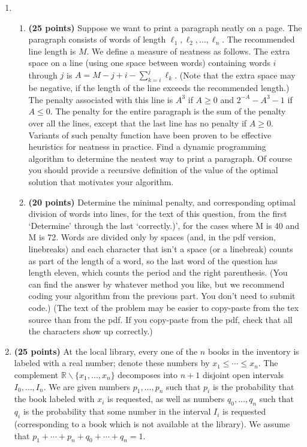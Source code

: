 \documentclass[11pt]{article}
\begin{document}
\begin{enumerate}
\item
\begin{enumerate}
\item
{\bf (25 points)}
Suppose we want to print a paragraph neatly on a page. The
paragraph consists of words of length $\ell_1,\ell_2,\ldots,\ell_n$.
The recommended line length is $M$. We
define a measure of neatness as follows. The extra space on a line
(using one space between words) containing words $i$ through
$j$  is $A = M-j+i-\sum_{k=i}^j \ell_k$. (Note that the extra space may be negative, if the length of the line exceeds the recommended length.) The penalty associated with this line
is $A^3$ if $A \geq 0$ and $2^{-A}-A^3-1$ if $A \leq 0$. The penalty for the entire paragraph
is the sum of the penalty over all the lines, except that the last line has no penalty if $A \ge 0$. 
Variants of such penalty function have been proven to be effective
heuristics for neatness in practice. Find a dynamic programming
algorithm to determine the neatest way to print a paragraph. Of
course you should provide a recursive definition of the value of the
optimal solution that motivates your algorithm.


\item
{\bf (20 points)}
Determine the minimal penalty, and corresponding optimal division of words into lines, for the text of this question, from the first `Determine' through the last `correctly.)', for the cases where M is 40 and M is 72. Words are divided only by spaces (and, in the pdf version, linebreaks) and each character that isn't a space (or a linebreak) counts as part of the length of a word, so the last word of the question has length eleven, which counts the period and the right parenthesis. (You can find the answer by whatever method you like, but we recommend coding your algorithm from the previous part. You don't need to submit code.) (The text of the problem may be easier to copy-paste from the tex source than from the pdf. If you copy-paste from the pdf, check that all the characters show up correctly.)
\end{enumerate}

\item \textbf{(25 points)} At the local library, every one of the $n$ books in the inventory is labeled with a real number; denote these numbers by $x_1 \le \cdots \le x_n$. The complement $\mathbb{R}\backslash \{x_1,\ldots,x_n\}$ decomposes into $n+1$ disjoint open intervals $I_0,\ldots, I_n$. We are given numbers $p_1,\ldots,p_n$ such that $p_i$ is the probability that the book labeled with $x_i$ is requested, as well as numbers $q_0,\ldots,q_n$ such that $q_i$ is the probability that some number in the interval $I_i$ is requested (corresponding to a book which is not available at the library). We assume that $p_1 + \cdots + p_n + q_0 + \cdots + q_n = 1$.


\end{enumerate}
\end{document}
